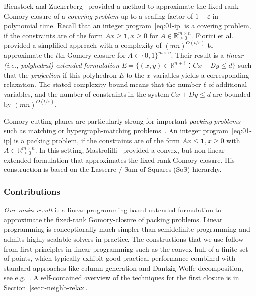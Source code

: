 \documentclass[11pt]{article}
\newcommand{\larstodo}[1]{\todo[backgroundcolor=pinktransparent, linecolor=pink!80]{#1}}
\newcommand{\one}{\mathbf{1}}
\theoremstyle{remark}
\begin{document}
Bienstock and
Zuckerberg~\cite{bz06} provided a method to approximate the fixed-rank 
Gomory-closure of a \emph{covering problem} up to a scaling-factor of $1+ε$
 in
polynomial time. Recall that an integer program~\eqref{eq:01-ip} is a covering
problem, if the constraints are of the form $Ax≥\one, x ≥0$ for
$A ∈ ℝ^{m ×n}_{≥0}$. Fiorini et al.~\cite{fhw21} provided a simplified
approach with a complexity of $(mn)^{O(t/ε)}$ to approximate the
$t$th Gomory closure for $A ∈\{0,1\}^{m ×n}$. Their result is a \emph{linear (i.e., polyhedral) extended
  formulation } $E = \{(x,y) ∈ ℝ^{n+ℓ} ：Cx + Dy ≤ d \}$ such that the
\emph{projection} if this polyhedron $E$ to the $x$-variables yields a
corresponding relaxation. The stated complexity bound means that the number  $ℓ$ of additional variables, and
the number of constraints in the system $Cx+Dy≤d$ are bounded by
$(mn)^{O(t/ε)}$.%


Gomory cutting planes are particularly strong for important \emph{packing problems} such as matching or hypergraph-matching problems~\cite{st10,cl12}. An integer program~\eqref{eq:01-ip} is a packing problem, if the constraints are of the form $Ax≤ \one, x≥0$ with $A ∈ ℝ_{≥0}^{m ×n}$. 
In this setting, Mastrolilli~\cite{mas20} provided a convex, but  non-linear extended formulation that approximates the fixed-rank Gomory-closure. His construction is based on the Lasserre / Sum-of-Squares (SoS) hierarchy. 


\subsubsection*{Contributions}

\emph{Our main result} is a linear-programming based extended formulation to approximate the fixed-rank Gomory-closure of packing problems.  
Linear programming is conceptionally much simpler than semidefinite programming and admits
highly scalable solvers in practice. 
The constructions that we use follow from first principles in linear programming such as the convex hull of a finite set of points, which typically exhibit good practical performance combined with standard approaches like
column generation and Dantzig-Wolfe decomposition, see e.g.~\cite{wolsey2020integer, dantzig1960decomposition}. 
A self-contained overview of the techniques for the first closure is in Section~\ref{sec:r-neighb-relax}.
\end{document}

